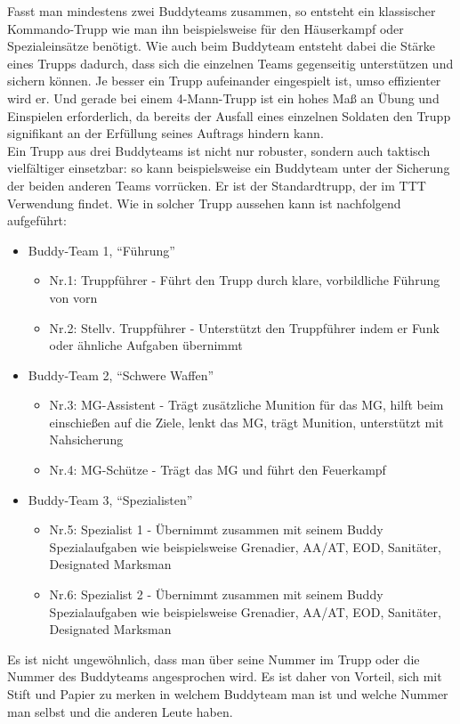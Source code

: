 Fasst man mindestens zwei Buddyteams zusammen, so entsteht ein klassischer Kommando-Trupp wie man ihn beispielsweise für den Häuserkampf oder Spezialeinsätze benötigt. Wie auch beim Buddyteam entsteht dabei die Stärke eines Trupps dadurch, dass sich die einzelnen Teams gegenseitig unterstützen und sichern können. Je besser ein Trupp aufeinander eingespielt ist, umso effizienter wird er. Und gerade bei einem 4-Mann-Trupp ist ein hohes Maß an Übung und Einspielen erforderlich, da bereits der Ausfall eines einzelnen Soldaten den Trupp signifikant an der Erfüllung seines Auftrags hindern kann. \\
	Ein Trupp aus drei Buddyteams ist nicht nur robuster, sondern auch taktisch vielfältiger einsetzbar: so kann beispielsweise ein Buddyteam unter der Sicherung der beiden anderen Teams vorrücken. Er ist der Standardtrupp, der im \ac{TTT} Verwendung findet. Wie in solcher Trupp aussehen kann ist nachfolgend aufgeführt:
		\begin{itemize}
			\item Buddy-Team 1, “Führung” 
			\begin{itemize}	
				\item Nr.1: Truppführer -  Führt den Trupp durch klare, vorbildliche Führung von vorn
				\item Nr.2: Stellv. Truppführer - Unterstützt den Truppführer indem er Funk oder ähnliche Aufgaben übernimmt
			\end{itemize}
		\end{itemize}

		\begin{itemize}
			\item Buddy-Team 2, “Schwere Waffen” 
			\begin{itemize}
				\item Nr.3: MG-Assistent - Trägt zusätzliche Munition für das MG, hilft beim einschießen auf die Ziele, lenkt das MG, trägt Munition, unterstützt mit Nahsicherung
				\item Nr.4: MG-Schütze - Trägt das MG und führt den Feuerkampf
			\end{itemize}
		\end{itemize}

		\begin{itemize}
			\item Buddy-Team 3, “Spezialisten” 
			\begin{itemize} 
				\item Nr.5: Spezialist 1 - Übernimmt zusammen mit seinem Buddy Spezialaufgaben wie beispielsweise Grenadier, \ac{AA}/\ac{AT}, \ac{EOD}, Sanitäter, Designated Marksman
				\item Nr.6: Spezialist 2 - Übernimmt zusammen mit seinem Buddy Spezialaufgaben wie beispielsweise Grenadier, \ac{AA}/\ac{AT}, \ac{EOD}, Sanitäter, Designated Marksman
			\end{itemize}
		\end{itemize}
Es ist nicht ungewöhnlich, dass man über seine Nummer im Trupp oder die Nummer des Buddyteams angesprochen wird. Es ist daher von Vorteil, sich mit Stift und Papier zu merken in welchem Buddyteam man ist und welche Nummer man selbst und die anderen Leute haben.